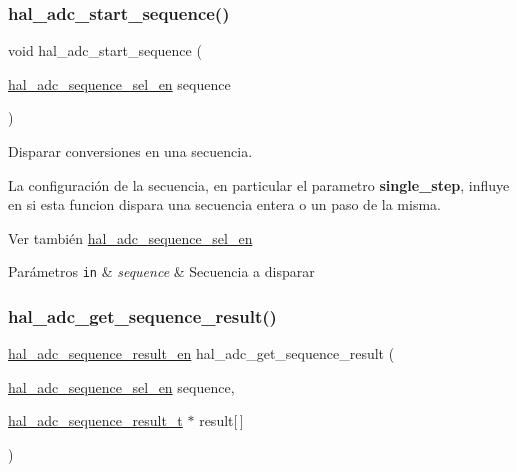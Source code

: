 \subsubsection{\texorpdfstring{hal\+\_\+adc\+\_\+start\+\_\+sequence()}{hal\_adc\_start\_sequence()}}
{\footnotesize\ttfamily void hal\+\_\+adc\+\_\+start\+\_\+sequence (\begin{DoxyParamCaption}\item[{\hyperlink{group__ADC_ga9297d7b14d7018a94bce94f0103d8559}{hal\+\_\+adc\+\_\+sequence\+\_\+sel\+\_\+en}}]{sequence }\end{DoxyParamCaption})}



Disparar conversiones en una secuencia. 

La configuración de la secuencia, en particular el parametro {\bfseries single\+\_\+step}, influye en si esta funcion dispara una secuencia entera o un paso de la misma.

\begin{DoxySeeAlso}{Ver también}
\hyperlink{group__ADC_ga9297d7b14d7018a94bce94f0103d8559}{hal\+\_\+adc\+\_\+sequence\+\_\+sel\+\_\+en} 
\end{DoxySeeAlso}

\begin{DoxyParams}[1]{Parámetros}
\mbox{\tt in}  & {\em sequence} & Secuencia a disparar \\
\hline
\end{DoxyParams}
\mbox{\label{group__ADC_ga2abe86b92546f8f4726dd65a7a9ddc0d}} 
\subsubsection{\texorpdfstring{hal\+\_\+adc\+\_\+get\+\_\+sequence\+\_\+result()}{hal\_adc\_get\_sequence\_result()}}
{\footnotesize\ttfamily \hyperlink{group__ADC_ga7761986f9c56b809bce1299c6c32eddd}{hal\+\_\+adc\+\_\+sequence\+\_\+result\+\_\+en} hal\+\_\+adc\+\_\+get\+\_\+sequence\+\_\+result (\begin{DoxyParamCaption}\item[{\hyperlink{group__ADC_ga9297d7b14d7018a94bce94f0103d8559}{hal\+\_\+adc\+\_\+sequence\+\_\+sel\+\_\+en}}]{sequence,  }\item[{\hyperlink{group__ADC_structhal__adc__sequence__result__t}{hal\+\_\+adc\+\_\+sequence\+\_\+result\+\_\+t} $\ast$}]{result\mbox{[}$\,$\mbox{]} }\end{DoxyParamCaption})}



